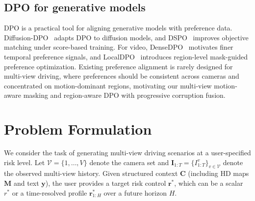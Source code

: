 \documentclass{article}
\begin{document}
\subsection{DPO for generative models}

DPO is a practical tool for aligning generative models with preference data. Diffusion-DPO~\cite{wallace2024diffusion} adapts DPO to diffusion models, and DSPO~\cite{zhu2025dspo} improves objective matching under score-based training. For video, DenseDPO~\cite{wu2025densedpo} motivates finer temporal preference signals, and LocalDPO~\cite{huang2026mind} introduces region-level mask-guided preference optimization. Existing preference alignment is rarely designed for multi-view driving, where preferences should be consistent across cameras and concentrated on motion-dominant regions, motivating our multi-view motion-aware masking and region-aware DPO with progressive corruption fusion.

\section{Problem Formulation}

We consider the task of generating multi-view driving scenarios at a user-specified risk level. Let $\mathcal{V}=\{1,\dots,V\}$ denote the camera set and $\mathbf{I}_{1:T}=\{I_{1:T}^{v}\}_{v\in\mathcal{V}}$ denote the observed multi-view history. Given structured context $\mathbf{C}$ (including HD maps $\mathbf{M}$ and text $\mathbf{y}$), the user provides a target risk control $\mathbf{r}^{*}$, which can be a scalar $r^{*}$ or a time-resolved profile $\mathbf{r}^{*}_{1:H}$ over a future horizon $H$.
\end{document}
